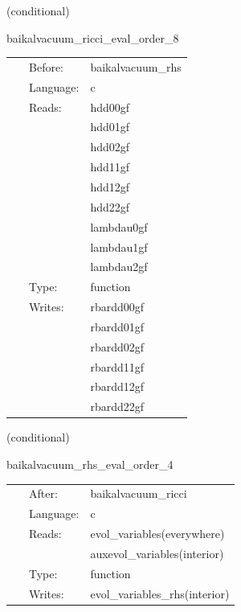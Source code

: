 \vspace{5mm}

   (conditional) 

\hspace{5mm} baikalvacuum\_ricci\_eval\_order\_8 

\hspace{5mm}{\it compute ricci tensor, needed for bssn rhss, at finite-differencing order 8 } 


\hspace{5mm}

 \begin{tabular*}{160mm}{cll} 
~ & Before:  & baikalvacuum\_rhs \\ 
~ & Language:  & c \\ 
~ & Reads:  & hdd00gf \\ 
~& ~ &hdd01gf\\ 
~& ~ &hdd02gf\\ 
~& ~ &hdd11gf\\ 
~& ~ &hdd12gf\\ 
~& ~ &hdd22gf\\ 
~& ~ &lambdau0gf\\ 
~& ~ &lambdau1gf\\ 
~& ~ &lambdau2gf\\ 
~ & Type:  & function \\ 
~ & Writes:  & rbardd00gf \\ 
~& ~ &rbardd01gf\\ 
~& ~ &rbardd02gf\\ 
~& ~ &rbardd11gf\\ 
~& ~ &rbardd12gf\\ 
~& ~ &rbardd22gf\\ 
\end{tabular*} 


\vspace{5mm}

   (conditional) 

\hspace{5mm} baikalvacuum\_rhs\_eval\_order\_4 

\hspace{5mm}{\it evaluate bssn rhss, at finite-differencing order 4 } 


\hspace{5mm}

 \begin{tabular*}{160mm}{cll} 
~ & After:  & baikalvacuum\_ricci \\ 
~ & Language:  & c \\ 
~ & Reads:  & evol\_variables(everywhere) \\ 
~& ~ &auxevol\_variables(interior)\\ 
~ & Type:  & function \\ 
~ & Writes:  & evol\_variables\_rhs(interior) \\ 
\end{tabular*} 


